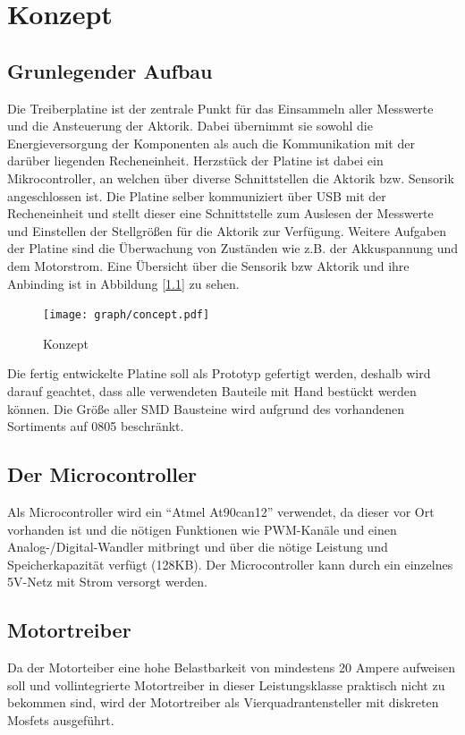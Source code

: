 
\chapter{Konzept}


\section{Grunlegender Aufbau}

Die Treiberplatine ist der zentrale Punkt für das Einsammeln aller Messwerte und die Ansteuerung der Aktorik. Dabei übernimmt sie sowohl die Energieversorgung der Komponenten als auch
die Kommunikation mit der darüber liegenden Recheneinheit. Herzstück der Platine ist dabei ein Mikrocontroller, an welchen über diverse Schnittstellen die Aktorik bzw. Sensorik
angeschlossen ist. Die Platine selber kommuniziert über USB mit der Recheneinheit und stellt dieser eine Schnittstelle zum Auslesen der Messwerte und Einstellen der Stellgrößen für die Aktorik
zur Verfügung. Weitere Aufgaben der Platine sind die Überwachung von Zuständen wie z.B. der Akkuspannung und dem Motorstrom. Eine Übersicht über die Sensorik bzw Aktorik und ihre Anbinding ist in 
Abbildung [\ref{fig:konzept}] zu sehen.

\begin{figure}[H]
\centering
\texttt{[image: graph/concept.pdf]}\\
\caption{Konzept}
\label{fig:konzept}
\end{figure}


Die fertig entwickelte Platine soll als Prototyp gefertigt werden, deshalb wird darauf geachtet, dass alle verwendeten Bauteile mit Hand bestückt werden können.
Die Größe aller SMD Bausteine wird aufgrund des vorhandenen Sortiments auf 0805 beschränkt.


\section{Der Microcontroller}
Als Microcontroller wird ein ``Atmel At90can12''\cite{ds-at90can} verwendet, da dieser vor Ort vorhanden ist und die nötigen Funktionen wie PWM-Kanäle und einen Analog-/Digital-Wandler mitbringt und 
über die nötige Leistung und Speicherkapazität verfügt (128KB). Der Microcontroller kann durch ein einzelnes 5V-Netz mit Strom versorgt werden.




\section{Motortreiber}
Da der Motorteiber eine hohe Belastbarkeit von mindestens 20 Ampere aufweisen soll und
vollintegrierte Motortreiber in dieser Leistungsklasse praktisch nicht zu bekommen sind, wird der Motortreiber als Vierquadrantensteller mit diskreten Mosfets ausgeführt.

